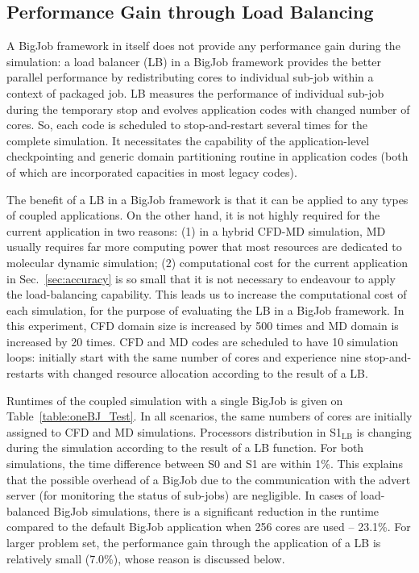 \documentclass[preprint,12pt]{elsarticle}
\newcommand{\subscript}[1]{\ensuremath{_{\textrm{#1}}}}
\newcommand{\lb}[0]{\subscript{LB} }
\begin{document}
\subsection{Performance Gain through Load Balancing}
A BigJob framework in itself does not provide any performance gain 
during the simulation: a load balancer (LB) in a BigJob framework provides 
the better parallel performance by redistributing cores 
to individual sub-job within a context of packaged job. 
LB measures the performance of individual sub-job during the temporary stop 
and evolves application codes with changed number of cores. So, each code
is scheduled to stop-and-restart several times for the complete simulation.
It necessitates the capability of the application-level checkpointing 
and generic domain partitioning routine in application codes (both of which are 
incorporated capacities in most legacy codes).

The benefit of a LB in a BigJob framework is that it can be applied to any types of
coupled applications. On the other hand, it is not highly required for the current
application in two reasons: (1) in a hybrid CFD-MD simulation, MD usually requires
far more computing power that most resources are dedicated to
molecular dynamic simulation; (2) computational cost for the current application
in Sec.~\ref{sec:accuracy} is so small that it is not necessary
to endeavour to apply the load-balancing capability.
This leads us to increase the computational cost of each simulation, 
for the purpose of evaluating the LB in a BigJob framework. 
In this experiment, CFD domain size is increased by 500 times and 
MD domain is increased by 20 times.
CFD and MD codes are scheduled to have 10 simulation loops:
initially start with the same number of cores and
experience nine stop-and-restarts with changed resource allocation
according to the result of a LB.

Runtimes of the coupled simulation with a single BigJob is given on 
Table~\ref{table:oneBJ_Test}. In all scenarios, the same numbers of cores 
are initially assigned to CFD and MD simulations. Processors distribution in S1\lb
is changing during the simulation according to the result of a LB function. 
For both simulations, the time difference between S0 and S1 are within 1\%.
This explains that the possible overhead of a BigJob 
due to the communication with the advert server 
(for monitoring the status of sub-jobs) are negligible.
In cases of load-balanced BigJob simulations, there is 
a significant reduction in the runtime compared to the 
default BigJob application when 256 cores are used -- 23.1\%. 
For larger problem set, the performance gain through the application of
a LB is relatively small (7.0\%), whose reason is discussed below.
\end{document}
